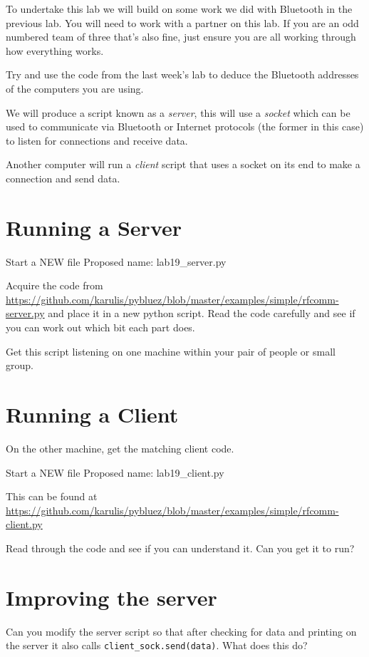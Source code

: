 \documentclass[12pt,oneside]{cttutorial}
\begin{document}
To undertake this lab we will build on some work we did with Bluetooth in the previous lab. You will need to work with a partner on this lab. If you are an odd numbered team of three that's also fine, just ensure you are all working through how everything works.

Try and use the code from the last week's lab to deduce the Bluetooth addresses of the computers you are using.

We will produce a script known as a \emph{server}, this will use a \emph{socket} which can be used to communicate via Bluetooth or Internet protocols (the former in this case) to listen for connections and receive data.

Another computer will run a \emph{client} script that uses a socket on its end to make a connection and send data.




\section{Running a Server}

\alert{Start a NEW file}
Proposed name: lab19\_server.py

Acquire the code from \url{https://github.com/karulis/pybluez/blob/master/examples/simple/rfcomm-server.py} and place it in a new python script.  Read the code carefully and see if you can work out which bit each part does.

Get this script listening on one machine within your pair of people or small group.

\section{Running a Client}

On the other machine, get the matching client code.

\alert{Start a NEW file}
Proposed name: lab19\_client.py

This can be found at \url{https://github.com/karulis/pybluez/blob/master/examples/simple/rfcomm-client.py}

Read through the code and see if you can understand it. Can you get it to run?

\section{Improving the server}

Can you modify the server script so that after checking for data and printing on the server it also calls \lstinline!client_sock.send(data)!. What does this do?
\end{document}
